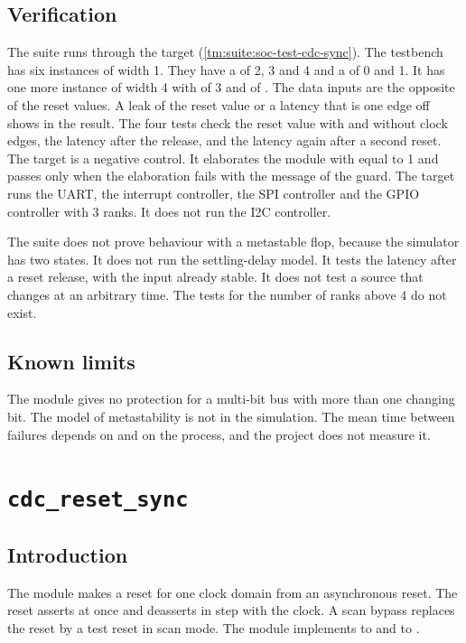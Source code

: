\subsection{Verification}
The suite  runs through the target  (\cref{tm:suite:soc-test-cdc-sync}). The testbench has six instances of width 1. They have a  of 2, 3 and 4 and a  of 0 and 1. It has one more instance of width 4 with  of 3 and  of . The data inputs are the opposite of the reset values. A leak of the reset value or a latency that is one edge off shows in the result. The four tests check the reset value with and without clock edges, the latency after the release, and the latency again after a second reset. The target  is a negative control. It elaborates the module with  equal to 1 and passes only when the elaboration fails with the message of the guard. The target  runs the UART, the interrupt controller, the SPI controller and the GPIO controller with 3 ranks. It does not run the I2C controller.

The suite does not prove behaviour with a metastable flop, because the simulator has two states. It does not run the settling-delay model. It tests the latency after a reset release, with the input already stable. It does not test a source that changes at an arbitrary time. The tests for the number of ranks above 4 do not exist.

\subsection{Known limits}
The module gives no protection for a multi-bit bus with more than one changing bit. The model of metastability is not in the simulation. The mean time between failures depends on  and on the process, and the project does not measure it.

\section{\texttt{cdc\_reset\_sync}}\label{tm:mod:cdc-reset-sync}

\subsection{Introduction}
The module  makes a reset for one clock domain from an asynchronous reset. The reset asserts at once and deasserts in step with the clock. A scan bypass replaces the reset by a test reset in scan mode. The module implements  to  and  to .

